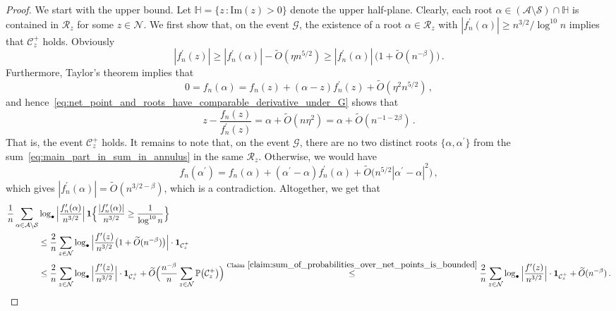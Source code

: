 \documentclass[11pt]{amsart}
\theoremstyle{remark}
\theoremstyle{definition}
\newcommand{\cR}{\mathcal R}
\newcommand{\bP}{\mathbb P}
\newcommand{\cA}{\mathcal A}
\newcommand{\cC}{\mathcal C}
\newcommand{\cN}{\mathcal N}
\newcommand{\cG}{\mathcal G}
\newcommand{\one}{\boldsymbol{1}}
\begin{document}
    \begin{proof}
        We start with the upper bound.  Let $\mathbb{H} = \big\{z \, :  \text{Im}(z)>0\big\}$ denote the upper half-plane. Clearly, each root $\alpha\in (\cA\setminus \mathcal{S})  \cap \mathbb{H} $ is contained in $\cR_z$ for some $z\in \cN$.  We first show that, on the event $\cG$, the existence of a root $\alpha\in \cR_z$ with $|f_n^\prime(\alpha)|\ge n^{3/2}/\log^{10} n$ implies that $\cC_z^+$ holds. Obviously
        \begin{equation}
            \label{eq:net_point_and_roots_have_comparable_derivative_under_G}
            |f_n^\prime(z)| \ge |f_n^\prime(\alpha)| - \widetilde{O}(\eta n^{5/2}) \ge |f_n^\prime(\alpha)|\, \big(1 + \widetilde{O}(n^{-\beta})\big) \, .
        \end{equation} 
        Furthermore, Taylor's theorem implies that 
        \[
        0 = f_n(\alpha) = f_n(z) + (\alpha-z)f_n^\prime(z) + \widetilde{O}(\eta^2 n^{5/2}) \, , 
        \]
        and hence~\eqref{eq:net_point_and_roots_have_comparable_derivative_under_G} shows that
        \[
        z-\frac{f_n(z)}{f_n^\prime(z)} = \alpha + \widetilde{O}(n\eta^2) = \alpha + \widetilde{O}(n^{-1-2\beta}) \, .
        \]
        That is, the event $\cC_z^+$ holds. It remains to note that, on the event $\cG$, there are no two distinct roots $\{\alpha,\alpha^\prime\}$ from the sum~\eqref{eq:main_part_in_sum_in_annulus} in the same $\cR_z$. Otherwise, we would have
        \[
        f_n(\alpha^\prime) =f_n(\alpha) + (\alpha^\prime-\alpha) f_n^\prime(\alpha) + \widetilde{O}\big(n^{5/2}|\alpha^\prime-\alpha|^2\big) \, ,
        \]
        which gives $|f_n^\prime(\alpha)| = \widetilde{O}(n^{3/2-\beta})$, which is a contradiction. Altogether, we get that
        \begin{align*}
            \frac{1}{n} \sum_{\alpha \in \cA\setminus \mathcal{S}} & \log_\bullet \Big|\frac{f_n'(\alpha)}{n^{3/2}} \Big| \, \one\Big\{\frac{|f_n'(\alpha)|}{n^{3/2}} \geq \frac{1}{\log^{10}n}  \Big\} \\ &\leq \frac{2}{n} \sum_{z\in \cN} \log_\bullet \Big|\frac{f^\prime(z)}{n^{3/2}}\big(1 + \widetilde{O}(n^{-\beta})\big)\Big| \cdot \one_{\cC_z^+}  \\ &\leq \frac{2}{n} \sum_{z\in \cN} \log_\bullet \Big|\frac{f^\prime(z)}{n^{3/2}}\Big| \cdot \one_{\cC_z^+} + \widetilde{O}\Big( \frac{n^{-\beta}}{n}\sum_{z\in \cN} \bP\big(\cC_z^+\big)\Big) \stackrel{\text{Claim}~\ref{claim:sum_of_probabilities_over_net_points_is_bounded}}{\le} \frac{2}{n} \sum_{z\in \cN} \log_\bullet \Big|\frac{f^\prime(z)}{n^{3/2}}\Big| \cdot \one_{\cC_z^+} + \widetilde{O}(n^{-\beta}) \, .       

\end{align*}
\end{proof}
\end{document}
